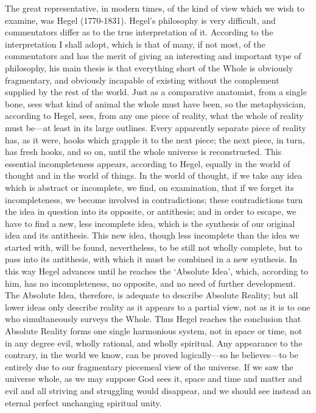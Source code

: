 \documentclass[oneside,letterpaper,12pt]{book}
\begin{document}
The great representative, in modern times, of the kind of view which we
wish to examine, was Hegel (1770-1831). \label{hegel} Hegel's
philosophy is very difficult, and commentators differ as to the true
interpretation of it. According to the interpretation I shall adopt,
which is that of many, if not most, of the commentators and has the
merit of giving an interesting and important type of philosophy, his
main thesis is that everything short of the Whole is obviously
fragmentary, and obviously incapable of existing without the complement
supplied by the rest of the world. Just as a comparative anatomist, from
a single bone, sees what kind of animal the whole must have been, so the
metaphysician, according to Hegel, sees, from any one piece of reality,
what the whole of reality must be---at least in its large outlines.
Every apparently separate piece of reality has, as it were, hooks which
grapple it to the next piece; the next piece, in turn, has fresh hooks,
and so on, until the whole universe is reconstructed. This essential
incompleteness appears, according to Hegel, equally in the world of
thought and in the world of things. In the world of thought, if we take
any idea which is abstract or incomplete, we find, on examination, that
if we forget its incompleteness, we become involved in contradictions;
these contradictions turn the idea in question into its opposite, or
antithesis; and in order to escape, we have to find a new, less
incomplete idea, which is the synthesis of our original idea and its
antithesis. This new idea, though less incomplete than the idea we
started with, will be found, nevertheless, to be still not wholly
complete, but to pass into its antithesis, with which it must be
combined in a new synthesis. In this way Hegel advances until he reaches
the `Absolute Idea', which, according to
him, has no incompleteness, no opposite, and no need of further
development. The Absolute Idea, therefore, is adequate to describe
Absolute Reality; but all lower ideas only describe reality as it
appears to a partial view, not as it is to one who simultaneously
surveys the Whole. \label{harmonious} Thus Hegel reaches the conclusion that Absolute
Reality forms one single harmonious system, not in space or time, not in
any degree evil, wholly rational, and wholly spiritual. Any appearance
to the contrary, in the world we know, can be proved logically---so he
believes---to be entirely due to our fragmentary piecemeal view of the
universe. If we saw the universe whole, as we may suppose God sees it,
space and time and matter and evil and all striving and struggling would
disappear, and we should see instead an eternal perfect unchanging
spiritual unity.
\end{document}
